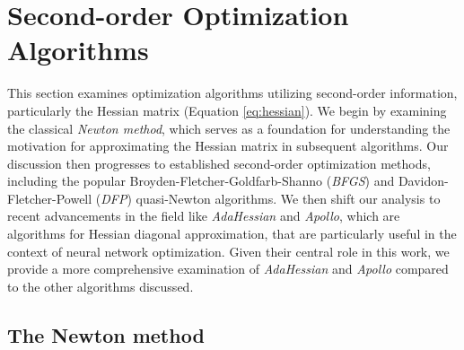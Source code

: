  \section{Second-order Optimization Algorithms}
 \label{sec:secondorder}
This section examines optimization algorithms utilizing second-order information, particularly the Hessian matrix (Equation \ref{eq:hessian}). 
We begin by examining the classical \emph{Newton method}, which serves as a foundation for understanding the motivation
for approximating the Hessian matrix in subsequent algorithms. Our discussion then progresses to established
second-order optimization methods, including the popular Broyden-Fletcher-Goldfarb-Shanno (\emph{BFGS}\cite{BFGS})
and Davidon-Fletcher-Powell (\emph{DFP}\cite{Goodfellow-et-al-2016}) quasi-Newton algorithms. We then shift our analysis to recent advancements in the field
like \emph{AdaHessian}\cite{yao2021adahessian} and \emph{Apollo}\cite{apollo}, which are algorithms for Hessian diagonal approximation, that are particularly useful in the context of neural network optimization.
Given their central role in this work, we provide a more comprehensive examination of \emph{AdaHessian} and \emph{Apollo} compared to the other algorithms discussed.
 \subsection{The Newton method}
 \label{sec:newton}

